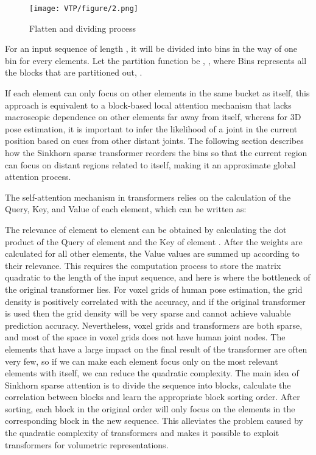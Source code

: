 \documentclass[lettersize,journal]{IEEEtran}
\begin{document}
\begin{figure}[h]
  \centering
  \texttt{[image: VTP/figure/2.png]}
  \caption{Flatten and dividing process}
  \label{dividing}
\end{figure}

\par For an input sequence  of length , it will be divided into  bins in the way of one bin for every  elements. Let the partition function be ,  , where Bins represents all the blocks that are partitioned out, . 
\par If each element can only focus on other elements in the same bucket as itself, this approach is equivalent to a block-based local attention mechanism that lacks macroscopic dependence on other elements far away from itself, whereas for 3D pose estimation, it is important to infer the likelihood of a joint in the current position based on cues from other distant joints. The following section describes how the Sinkhorn sparse transformer reorders the bins so that the current region can focus on distant regions related to itself, making it an approximate global attention process.
\par The self-attention mechanism in transformers relies on the calculation of the Query, Key, and Value of each element, which can be written as:





\par The relevance of element  to element  can be obtained by calculating the dot product of the Query of element  and the Key of element . After the weights are calculated for all other elements, the Value values are summed up according to their relevance. This requires the computation process to store the  matrix quadratic to the length of the input sequence, and here is where the bottleneck of the original transformer lies. For voxel grids of human pose estimation, the grid density is positively correlated with the accuracy, and if the original transformer is used then the grid density will be very sparse and cannot achieve valuable prediction accuracy. Nevertheless, voxel grids and transformers are both sparse, and most of the space in voxel grids does not have human joint nodes. The elements that have a large impact on the final result of the transformer are often very few, so if we can make each element focus only on the most relevant elements with itself, we can reduce the quadratic complexity. The main idea of Sinkhorn sparse attention is to divide the sequence into blocks, calculate the correlation between blocks and learn the appropriate block sorting order. After sorting, each block in the original order will only focus on the elements in the corresponding block in the new sequence. This alleviates the problem caused by the quadratic complexity of transformers and makes it possible to exploit transformers for volumetric representations.
\end{document}
